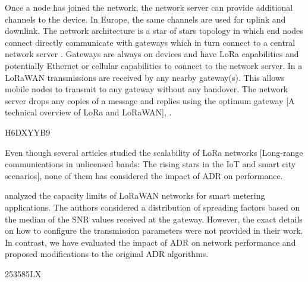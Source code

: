 Once a node has joined the network,
	the network server can provide additional channels to the device.
In Europe,
	the same channels are used for uplink and downlink.
The network architecture is a star of stars topology in which end nodes connect directly communicate with gateways which in turn connect to a central network server \cite{bankov_limits_2016}.
Gateways are always on devices and have LoRa capabilities and potentially Ethernet or cellular capabilities to connect to the network server.
In a LoRaWAN transmissions are received by any nearby gateway(s).
This allows mobile nodes to transmit to any gateway without any handover.
The network server drops any copies of a message and replies using the optimum gateway [A technical overview of LoRa and LoRaWAN],
	\cite{wixted_evaluation_2016}.

\cite{slabicki_adaptive_2018} H6DXYYB9

Even though several articles studied the scalability of LoRa networks [Long-range communications in unlicensed bands:
	The rising stars in the IoT and smart city scenarios]\cite{petajajarvi_coverage_2015}\cite{augustin_study_2016},
	none of them has considered the impact of ADR on performance.



\citet{varsier_capacity_2017} analyzed the capacity limits of LoRaWAN networks for smart metering applications.
The authors considered a distribution of spreading factors based on the median of the SNR values received at the gateway.
However,
	the exact details on how to configure the transmission parameters were not provided in their work.
In contrast,
	we have evaluated the impact of ADR on network performance and proposed modifications to the original ADR algorithms.





\cite{to_simulation_2018} 253585LX




